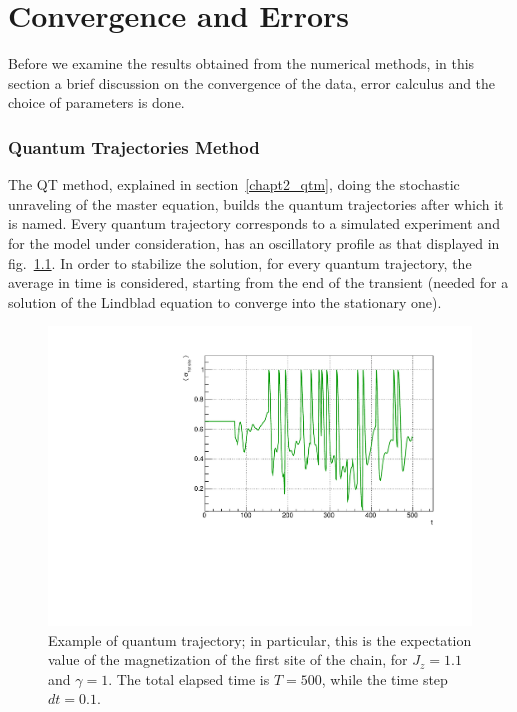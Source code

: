 \chapter{Convergence and Errors}
\label{AppendixB}

Before we examine the results obtained from the numerical methods, in this section a brief discussion on the convergence of the data, error calculus and the choice of parameters is done.

\subsection{Quantum Trajectories Method}
The QT method, explained in section~\ref{chapt2_qtm}, doing the stochastic unraveling of the master equation, builds the quantum trajectories after which it is named.  Every quantum trajectory corresponds to a simulated experiment and for the model under consideration, has an oscillatory profile as that displayed in fig.~\ref{fig:SS_s8J10511}. In order to stabilize the solution, for every quantum trajectory, the average in time is considered, starting from the end of the transient (needed for a solution of the Lindblad equation to converge into the stationary one).

\begin{figure}[H]
    \centering
    \includegraphics[scale=0.7]{Figures/SS_s8J10511.pdf}
    \caption{Example of quantum trajectory; in particular, this is the expectation value of the magnetization of the first site of the chain, for $J_z = 1.1$ and $\gamma = 1$. The total elapsed time is $T=500$, while the time step $dt = 0.1$.}
    \label{fig:SS_s8J10511}
\end{figure}

